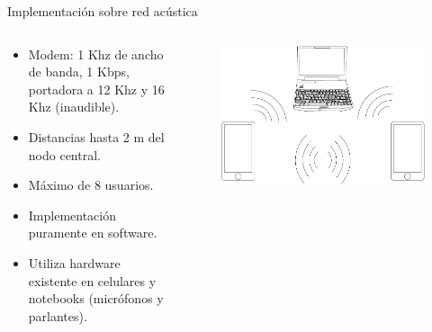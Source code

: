 \documentclass[aspectratio=169]{beamer}
\begin{document}
\begin{frame}{Implementación sobre red \color{red}acústica}

\begin{columns}
  \begin{column}{0.50\textwidth}

\begin{itemize}
 \item Modem: 1 Khz de ancho de banda, 1 Kbps, portadora a 12 Khz y 16 Khz (inaudible).
 \item Distancias hasta 2 m del nodo central.
 \item Máximo de 8 usuarios.
 \item Implementación puramente en software.
 \item Utiliza hardware existente en celulares y notebooks (micrófonos y parlantes).
 \end{itemize}

  \end{column}
  \begin{column}{0.50\textwidth}

 
\begin{figure}[t]
  \centering
  \includegraphics[width=0.85 \textwidth]{../graphs/compucelus.pdf}
\end{figure}

  \end{column}
\end{columns}

\end{frame}
\end{document}
